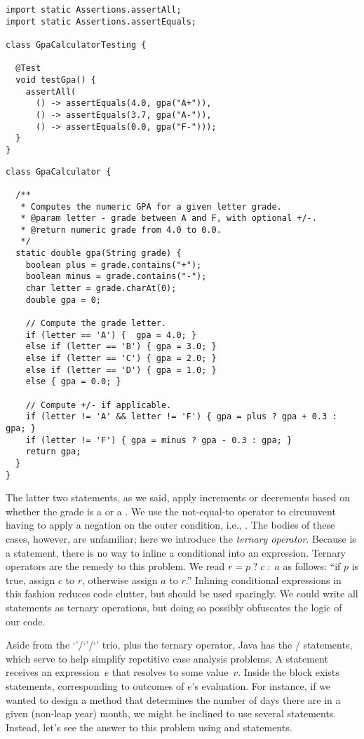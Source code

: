 \begin{lstlisting}[language=MyJava]
import static Assertions.assertAll;
import static Assertions.assertEquals;

class GpaCalculatorTesting {

  @Test
  void testGpa() {
    assertAll(
      () -> assertEquals(4.0, gpa("A+")),
      () -> assertEquals(3.7, gpa("A-")),
      () -> assertEquals(0.0, gpa("F-")));
  }
}
\end{lstlisting}

\begin{lstlisting}[language=MyJava]
class GpaCalculator {

  /**
   * Computes the numeric GPA for a given letter grade.
   * @param letter - grade between A and F, with optional +/-.
   * @return numeric grade from 4.0 to 0.0.
   */
  static double gpa(String grade) {
    boolean plus = grade.contains("+");
    boolean minus = grade.contains("-");
    char letter = grade.charAt(0);
    double gpa = 0;
    
    // Compute the grade letter.
    if (letter == 'A') {  gpa = 4.0; } 
    else if (letter == 'B') { gpa = 3.0; } 
    else if (letter == 'C') { gpa = 2.0; } 
    else if (letter == 'D') { gpa = 1.0; } 
    else { gpa = 0.0; }
    
    // Compute +/- if applicable.
    if (letter != 'A' && letter != 'F') { gpa = plus ? gpa + 0.3 : gpa; }
    if (letter != 'F') { gpa = minus ? gpa - 0.3 : gpa; }
    return gpa;
  }
}
\end{lstlisting}

The latter two  statements, as we said, apply increments or decrements based on whether the grade is a \ttt{+} or a \ttt{-}.
We use the not-equal-to operator \ttt{!=} to circumvent having to apply a negation on the outer condition, i.e., . 
The bodies of these cases, however, are unfamiliar; here we introduce the \emph{ternary operator}. 
Because  is a statement, there is no way to inline a conditional into an expression. 
Ternary operators are the remedy to this problem. 
We read ${r = p\;?\;c\;:\;a}$ as follows: ``if $p$ is true, assign $c$ to $r$, otherwise assign $a$ to $r$.'' 
Inlining conditional expressions in this fashion reduces code clutter, but should be used sparingly. We could write all  statements as ternary operations, but doing so possibly obfuscates the logic of our code.

Aside from the `'/`'/`' trio, plus the ternary operator, Java has the / statements, which serve to help simplify repetitive case analysis problems. 
A  statement receives an expression~$e$ that resolves to some value~$v$. 
Inside the  block exists  statements, corresponding to outcomes of $e$'s evaluation. 
For instance, if we wanted to design a method that determines the number of days there are in a given (non-leap year) month, we might be inclined to use several  statements. Instead, let's see the answer to this problem using  and  statements.

